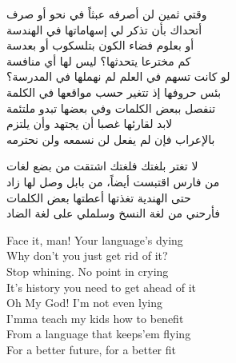\documentclass[letterpaper,12pt]{article}
\begin{document}
\begin{tcolorbox}[colback=boxcolor,colframe=headercolor,title=\textbf{Stanza 1},breakable]
{وقتي ثمين لن أصرفه عبثاً في نحو أو صرف \\
أتحداك بأن تذكر لي إسهاماتها في الهندسة \\
أو بعلوم فضاء الكون بتلسكوب أو بعدسة \\
كم مخترعا يتحدثها؟ ليس لها أي منافسة \\
لو كانت تسهم في العلم لم نهملها في المدرسة؟ \\
بئس حروفها إذ تتغير حسب مواقعها في الكلمة \\
تنفصل ببعض الكلمات وفي بعضها تبدو ملتئمة \\
لابد لقارئها غصبا أن يجتهد وأن يلتزم \\
بالإعراب فإن لم يفعل لن نسمعه ولن نحترمه \\
}
\end{tcolorbox}

\begin{tcolorbox}[colback=boxcolor,colframe=headercolor,title=\textbf{Stanza 2} ,breakable]
\textarabic{
لا تغتر بلغتك فلغتك اشتقت من بضع لغات \\
من فارس اقتبست أيضاً، من بابل وصل لها زاد \\
حتى الهندية تغذتها أعطتها بعض الكلمات \\
فأرحني من لغة النسخ وسلملي على لغة الضاد \\
}
\end{tcolorbox}

\begin{tcolorbox}[colback=boxcolor,colframe=headercolor,title=\textbf{Chorus (English)},breakable]
Face it, man! Your language's dying \\
Why don't you just get rid of it? \\
Stop whining. No point in crying \\
It's history you need to get ahead of it \\
Oh My God! I'm not even lying \\
I'mma teach my kids how to benefit \\
From a language that keeps'em flying \\
For a better future, for a better fit \\
\end{tcolorbox}
\end{document}
